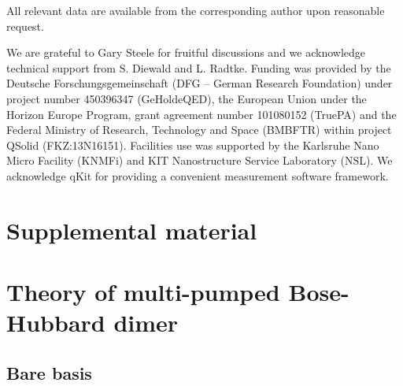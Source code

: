 \documentclass[%
reprint,
floatfix,
superscriptaddress,
amsmath,amssymb,
aps,
pra,
]{revtex4-2}
\begin{document}
All relevant data are available from the corresponding
author upon reasonable request.

\begin{acknowledgments}
We are grateful to Gary Steele for fruitful discussions and we acknowledge technical support from S. Diewald and L. Radtke. 
Funding was provided by the Deutsche Forschungsgemeinschaft (DFG – German Research Foundation) under project number 450396347 (GeHoldeQED), the European Union under the Horizon Europe Program, grant agreement number 101080152 (TruePA) and the Federal Ministry of Research, Technology and Space (BMBFTR) within project QSolid (FKZ:13N16151). Facilities use was supported by the Karlsruhe Nano Micro Facility (KNMFi) and KIT Nanostructure Service Laboratory (NSL). We acknowledge qKit for providing a convenient measurement software framework.
\end{acknowledgments}

\appendix

\section*{Supplemental material}

\section{Theory of multi-pumped Bose-Hubbard dimer}
\label{A_Theory}

\subsection{Bare basis}
\label{A_Double_pump_bare_basis}
\end{document}
